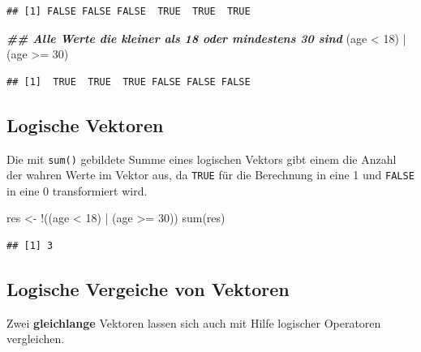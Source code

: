 \documentclass[
]{book}
\newenvironment{Shaded}{\begin{snugshade}}{\end{snugshade}}
\newcommand{\DecValTok}[1]{\textcolor[rgb]{0.00,0.00,0.81}{#1}}
\newcommand{\DocumentationTok}[1]{\textcolor[rgb]{0.56,0.35,0.01}{\textbf{\textit{#1}}}}
\newcommand{\FunctionTok}[1]{\textcolor[rgb]{0.00,0.00,0.00}{#1}}
\newcommand{\NormalTok}[1]{#1}
\newcommand{\OtherTok}[1]{\textcolor[rgb]{0.56,0.35,0.01}{#1}}
\newcommand{\SpecialCharTok}[1]{\textcolor[rgb]{0.00,0.00,0.00}{#1}}
\begin{document}
\begin{verbatim}
## [1] FALSE FALSE FALSE  TRUE  TRUE  TRUE
\end{verbatim}

\begin{Shaded}
\begin{Highlighting}[]
\DocumentationTok{\#\# Alle Werte die kleiner als 18 oder mindestens 30 sind}
\NormalTok{(age }\SpecialCharTok{\textless{}} \DecValTok{18}\NormalTok{) }\SpecialCharTok{|}\NormalTok{ (age }\SpecialCharTok{\textgreater{}=} \DecValTok{30}\NormalTok{) }
\end{Highlighting}
\end{Shaded}

\begin{verbatim}
## [1]  TRUE  TRUE  TRUE FALSE FALSE FALSE
\end{verbatim}

\hypertarget{logische-vektoren}{%
\subsection{Logische Vektoren}\label{logische-vektoren}}

Die mit \texttt{sum()} gebildete Summe eines logischen Vektors gibt einem die Anzahl der wahren Werte im Vektor aus, da \texttt{TRUE} für die Berechnung in eine 1 und \texttt{FALSE} in eine 0 transformiert wird.

\begin{Shaded}
\begin{Highlighting}[]
\NormalTok{res }\OtherTok{\textless{}{-}} \SpecialCharTok{!}\NormalTok{((age }\SpecialCharTok{\textless{}} \DecValTok{18}\NormalTok{) }\SpecialCharTok{|}\NormalTok{ (age }\SpecialCharTok{\textgreater{}=} \DecValTok{30}\NormalTok{))}
\FunctionTok{sum}\NormalTok{(res)}
\end{Highlighting}
\end{Shaded}

\begin{verbatim}
## [1] 3
\end{verbatim}

\hypertarget{logische-vergeiche-von-vektoren}{%
\subsection{Logische Vergeiche von Vektoren}\label{logische-vergeiche-von-vektoren}}

Zwei \textbf{gleichlange} Vektoren lassen sich auch mit Hilfe logischer Operatoren vergleichen.
\end{document}
